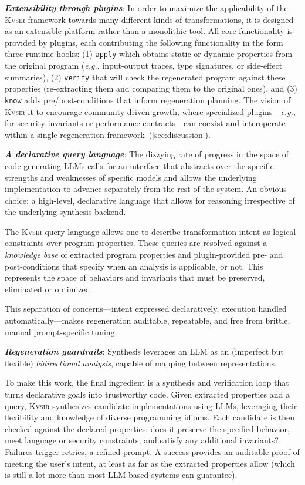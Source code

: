 \documentclass[sigplan,review,anonymous,10pt]{acmart}
\def\eg{{\em e.g.}, }
\newcommand{\sys}{{\scshape Kv{\textalpha}sir}\xspace}
\newcommand{\heading}[1]{\vspace{2pt}\noindent\textbf{\emph{#1}}:\enspace}
\newcommand{\ttt}[1]{\texttt{#1}\xspace}
\begin{document}

\heading{Extensibility through plugins}
In order to maximize the applicability of the \sys framework 
towards many different kinds of transformations,
it is designed as an extensible platform rather than a monolithic tool.
All core functionality is provided by plugins, each contributing
the following functionality in the form three runtime hooks:
(1) \ttt{apply} which obtains static or dynamic properties from the original program (\eg
input-output traces, type signatures, or side-effect summaries),
(2) \ttt{verify} that will check the regenerated program against these properties (re-extracting them and comparing them to the original ones),
and
(3) \ttt{know} adds pre/post-conditions that inform regeneration planning.
The vision of \sys it to encourage community-driven growth, where specialized plugins---\eg for
security invariants or performance contracts---can coexist and interoperate
within a single regeneration framework~(\cref{sec:discussion}).

\heading{A declarative query language}
The dizzying rate of progress in the space of 
code-generating LLMs calls for an interface 
that abstracts over the specific strengths and weaknesses of specific models 
and allows the underlying implementation to advance separately from the rest of the system.
An obvious choice: a high-level, declarative language that 
allows for reasoning irrespective of the underlying synthesis backend.

The \sys query language allows one to describe transformation intent as logical constraints over program 
properties. 
These queries are resolved against a \emph{knowledge base} of extracted 
program properties and plugin-provided pre- and post-conditions that specify when an analysis is applicable, or not.
This represents the space of behaviors and invariants 
that must be preserved, eliminated or optimized.

This separation of concerns---intent expressed declaratively, execution handled
automatically---makes regeneration auditable, repeatable, and free from brittle,
manual prompt-specific tuning.

\heading{Regeneration guardrails}
Synthesis leverages an LLM as an 
(imperfect but flexible) \emph{bidirectional analysis}, capable of 
mapping between representations.

To make this work, the final ingredient is a synthesis and verification loop that turns declarative goals into trustworthy code.
Given extracted properties and a query, \sys synthesizes candidate implementations using LLMs, leveraging their flexibility and knowledge of diverse programming idioms.
Each candidate is then checked against the declared properties: does it preserve the specified behavior, meet language or security constraints, and satisfy any additional invariants?
Failures trigger retries, a refined prompt.
A success provides an auditable proof of meeting the user's intent,
at least as far as the extracted properties allow (which is still a lot more than most LLM-based systems can guarantee).
\end{document}
